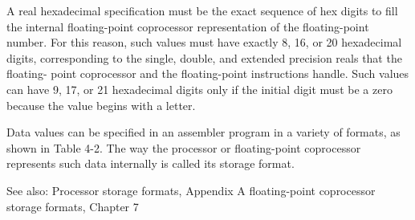 A real hexadecimal specification must be the exact sequence of hex digits to fill the internal floating-point coprocessor representation of the floating-point number. For this reason, such values must have exactly 8, 16, or 20 hexadecimal digits, corresponding to the single, double, and extended precision reals that the floating- point coprocessor and the floating-point instructions handle. Such values can have 9, 17, or 21 hexadecimal digits only if the initial digit must be a zero because the value begins with a letter.

Data values can be specified in an assembler program in a variety of formats, as shown in Table 4-2. The way the processor or floating-point coprocessor represents such data internally is called its storage format.

See also: Processor storage formats, Appendix A floating-point coprocessor storage formats, Chapter 7
